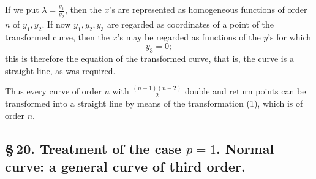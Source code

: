 \documentclass[10pt]{article}
\begin{document}
If we put \(\lambda=\frac{y_1}{y_2}\), then the \(x\)'s are represented as homogeneous functions of order \(n\) of \(y_1,y_2\). If now \(y_1,y_2,y_3\) are regarded as coordinates of a point of the transformed curve, then the \(x\)'s may be regarded as functions of the \(y\)'s for which
\[
y_3=0;
\]
this is therefore the equation of the transformed curve, that is, the curve is a straight line, as was required.

Thus every curve of order \(n\) with \(\frac{(n-1)(n-2)}{2}\) double and return points can be transformed into a straight line by means of the transformation (1), which is of order \(n\).

\subsection*{\S\,20. Treatment of the case \(p=1\). Normal curve: a general curve of third order.}
\end{document}
